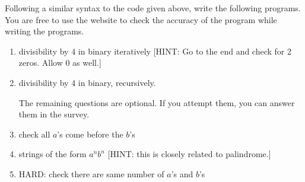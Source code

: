\documentclass[answers]{exam}
\begin{document}
    Following a similar syntax to the code given above, write the following programs. You are free to use the website to check the accuracy of the program while writing the programs.
    \begin{enumerate}
        \item divisibility by 4 in binary iteratively [HINT: Go to the end and check for 2 zeros. Allow 0 as well.]
        \begin{solution}
            \vspace*{520pt}
        \end{solution}
        
        \item divisibility by 4 in binary, recursively.
        \begin{solution}
            \vspace*{570pt}
        \end{solution}
        
        \noindent The remaining questions are optional. If you attempt them, you can answer them in the survey.
        \item check all $a$'s come before the $b$'s
        
        \item strings of the form $a^n b^n$ [HINT: this is closely related to palindrome.]

        \item HARD: check there are same number of $a$'s and $b$'s
    \end{enumerate}
    
    
\end{document}
